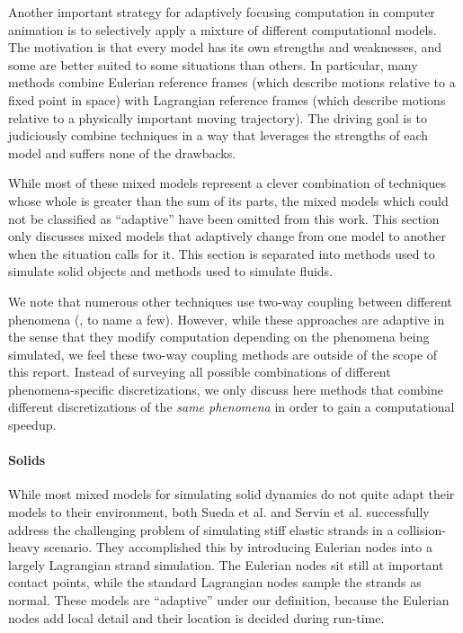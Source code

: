 Another important strategy for adaptively focusing computation in computer animation is to selectively apply a mixture of different computational models. The motivation is that every model has its own strengths and weaknesses, and some are better suited to some situations than others. In particular, many methods combine Eulerian reference frames (which describe motions relative to a fixed point in space) with Lagrangian reference frames (which describe motions relative to a physically important moving trajectory). The driving goal is to judiciously combine techniques in a way that leverages the strengths of each model and suffers none of the drawbacks.

While most of these mixed models represent a clever combination of techniques whose whole is greater than the sum of its parts, the mixed models which could not be classified as ``adaptive'' have been omitted from this work. This section only discusses mixed models that adaptively change from one model to another when the situation calls for it.
This section is separated into methods used to simulate solid objects and methods used to simulate fluids.

We note that numerous other techniques use two-way coupling between different phenomena (\hspace{1sp}\cite{carlson2004rigid,robinson2008two,shinar2008two,Remillard2013}, to name a few). However, while these approaches are adaptive in the sense that they modify computation depending on the phenomena being simulated, we feel these two-way coupling methods are outside of the scope of this report. Instead of surveying all possible combinations of different phenomena-specific discretizations, we only discuss here methods that combine different discretizations of the {\em same phenomena} in order to gain a computational speedup.

\paragraph{Solids}

While most mixed models for simulating solid dynamics do not quite adapt their models to their environment, both Sueda et al. \cite{Sueda2011} and Servin et al. \cite{Servin2011} successfully address the challenging problem of simulating stiff elastic strands in a collision-heavy scenario. They accomplished this by introducing Eulerian nodes into a largely Lagrangian strand simulation. The Eulerian nodes sit still at important contact points, while the standard Lagrangian nodes sample the strands as normal. These models are ``adaptive'' under our definition, because the Eulerian nodes add local detail and their location is decided during run-time.


